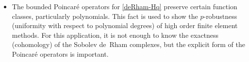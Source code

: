 \documentclass[11pt]{amsart}
\newcommand{\0}{\mathaccent23}
\begin{document}
\begin{itemize}
\begin{equation}
\begin{tikzcd}
\end{tikzcd}
\end{equation}
where $ \mathcal{P}_{r }\Lambda^{k}$ denotes the space of $k$-forms with polynomial coefficients of degree less than or equal to $r$ \cite{arnold2018finite,Arnold.D;Falk.R;Winther.R.2006a,hiptmair1999canonical}. See also, e.g., \cite{christiansen2018generalized,hu2020simple,hu2022family}, for applications to the construction of finite elements for Stokes problems.  The Poincar\'e operators \eqref{smooth-poincare} for the smooth de~Rham complex are sufficient for this purpose.
\item The bounded Poincar\'e operators \cite{costabel2010bogovskiui} for \eqref{deRham-Hq} preserve certain function classes, particularly polynomials. This fact is used to show the $p$-robustness (uniformity with respect to polynomial degrees) of high order finite element methods. For this application, it is not enough to know the exactness (cohomology) of the Sobolev de~Rham complexes, but the explicit form of the Poincar\'e operators is important.
\end{itemize}
\end{document}
